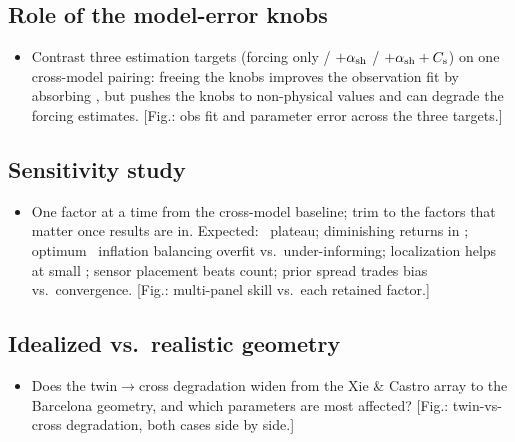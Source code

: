 \subsection{Role of the model-error knobs}
\label{sec:results:knobs}
\begin{itemize}
  \item Contrast three estimation targets (forcing only / $+\alpha_{\mathrm{sh}}$ /
        $+\alpha_{\mathrm{sh}}+C_{\mathrm{s}}$) on one cross-model pairing: freeing the knobs
        improves the observation fit by absorbing \discrepancy, but pushes the
        knobs to non-physical values and can degrade the forcing estimates.
        [Fig.: obs fit and parameter error across the three targets.]
\end{itemize}

\subsection{Sensitivity study}
\label{sec:results:sensitivity}
\begin{itemize}
  \item One factor at a time from the cross-model baseline; trim to the
        factors that matter once results are in. Expected: \Ne\ plateau;
        diminishing returns in \Na; optimum \Cd\ inflation balancing overfit
        vs.\ under-informing; localization helps at small \Ne; sensor
        placement beats count; prior spread trades bias vs.\ convergence.
        [Fig.: multi-panel skill vs.\ each retained factor.]
\end{itemize}

\subsection{Idealized vs.\ realistic geometry}
\label{sec:results:cases}
\begin{itemize}
  \item Does the twin$\to$cross degradation widen from the Xie \& Castro array
        to the Barcelona geometry, and which parameters are most affected?
        [Fig.: twin-vs-cross degradation, both cases side by side.]
\end{itemize}
